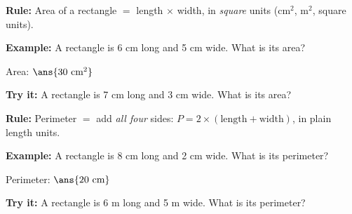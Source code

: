 \documentclass[12pt]{article}
\begin{document}


\begin{formulabox}
\textbf{Rule:} Area of a rectangle $=$ length $\times$ width, in
\emph{square} units (cm$^2$, m$^2$, square units).
\end{formulabox}

\begin{examplebox}
\textbf{Example:} A rectangle is 6 cm long and 5 cm wide. What is its area?

Area: $\ans{30\ \text{cm}^2}$
\end{examplebox}

\begin{tryitbox}
\textbf{Try it:} A rectangle is 7 cm long and 3 cm wide. What is its
area?\\[2pt]
\end{tryitbox}


\begin{formulabox}
\textbf{Rule:} Perimeter $=$ add \emph{all four} sides:
$P = 2 \times (\text{length} + \text{width})$, in plain length units.
\end{formulabox}

\begin{examplebox}
\textbf{Example:} A rectangle is 8 cm long and 2 cm wide. What is its
perimeter?

Perimeter: $\ans{20\ \text{cm}}$
\end{examplebox}

\begin{tryitbox}
\textbf{Try it:} A rectangle is 6 m long and 5 m wide. What is its
perimeter?\\[2pt]
\end{tryitbox}

\end{document}
